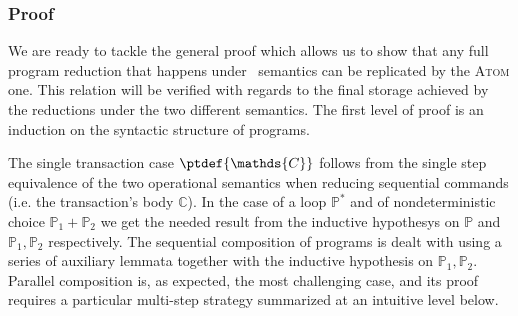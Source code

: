\tocless\subsubsection{Proof}

We are ready to tackle the general proof which allows us to show that any full program reduction that happens under \tpl\ semantics can be replicated by the \textsc{Atom} one. This relation will be verified with regards to the final storage achieved by the reductions under the two different semantics. The first level of proof is an induction on the syntactic structure of programs.

The single transaction case $\ptdef{\mathds{C}}$ follows from the single step equivalence of the two operational semantics when reducing sequential commands (i.e. the transaction's body $\mathds{C}$). In the case of a loop $\mathds{P}^*$ and of nondeterministic choice $\mathds{P}_1 + \mathds{P}_2$ we get the needed result from the inductive hypothesys on $\mathds{P}$ and $\mathds{P}_1, \mathds{P}_2$ respectively. The sequential composition of programs is dealt with using a series of auxiliary lemmata together with the inductive hypothesis on $\mathds{P}_1, \mathds{P}_2$. Parallel composition is, as expected, the most challenging case, and its proof requires a particular multi-step strategy summarized at an intuitive level below.
